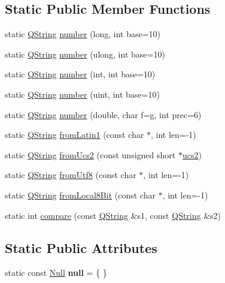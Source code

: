 \subsection*{Static Public Member Functions}
\begin{DoxyCompactItemize}
\item 
static \mbox{\hyperlink{class_q_string}{Q\+String}} \mbox{\hyperlink{class_q_string_ac6eeb4543ef6aa8e4b165ed947039cd8}{number}} (long, int base=10)
\item 
static \mbox{\hyperlink{class_q_string}{Q\+String}} \mbox{\hyperlink{class_q_string_a8d0965cab4025b7babc1aaa7d84aeb69}{number}} (ulong, int base=10)
\item 
static \mbox{\hyperlink{class_q_string}{Q\+String}} \mbox{\hyperlink{class_q_string_ac00103ffd860cbe3448ace2b490800cf}{number}} (int, int base=10)
\item 
static \mbox{\hyperlink{class_q_string}{Q\+String}} \mbox{\hyperlink{class_q_string_a38addca1148502aad34f7ee85eb1d344}{number}} (uint, int base=10)
\item 
static \mbox{\hyperlink{class_q_string}{Q\+String}} \mbox{\hyperlink{class_q_string_a653e603580c5e150e99997e12ddaddf5}{number}} (double, char f=\textquotesingle{}g\textquotesingle{}, int prec=6)
\item 
static \mbox{\hyperlink{class_q_string}{Q\+String}} \mbox{\hyperlink{class_q_string_ab8e9aa9ff378aa3f3e531b26598712e3}{from\+Latin1}} (const char $\ast$, int len=-\/1)
\item 
static \mbox{\hyperlink{class_q_string}{Q\+String}} \mbox{\hyperlink{class_q_string_acc31424e78107f6f711db5a2b9f7b8f4}{from\+Ucs2}} (const unsigned short $\ast$\mbox{\hyperlink{class_q_string_a25bed3caa16f09a748d9da0fdf4cea4a}{ucs2}})
\item 
static \mbox{\hyperlink{class_q_string}{Q\+String}} \mbox{\hyperlink{class_q_string_a3e1b40400c137f234bfd2fd73405bca7}{from\+Utf8}} (const char $\ast$, int len=-\/1)
\item 
static \mbox{\hyperlink{class_q_string}{Q\+String}} \mbox{\hyperlink{class_q_string_ad1175d375e2a8fee8e6411b855c63afb}{from\+Local8\+Bit}} (const char $\ast$, int len=-\/1)
\item 
static int \mbox{\hyperlink{class_q_string_ac8f4c4a5a71bab250e9021c6511269dd}{compare}} (const \mbox{\hyperlink{class_q_string}{Q\+String}} \&s1, const \mbox{\hyperlink{class_q_string}{Q\+String}} \&s2)
\end{DoxyCompactItemize}
\subsection*{Static Public Attributes}
\begin{DoxyCompactItemize}
\item 
\mbox{\label{class_q_string_ad5c6b3d92cd7034d555365fd39bfdf4b}} 
static const \mbox{\hyperlink{struct_q_string_1_1_null}{Null}} {\bfseries null} = \{ \}
\end{DoxyCompactItemize}
